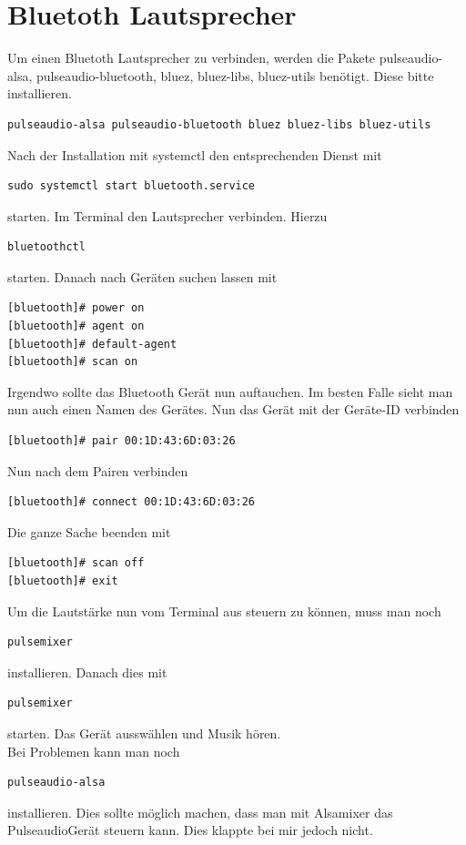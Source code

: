 \documentclass[11pt,fleqn]{book} %
\numberwithin{equation}{section} %
\numberwithin{figure}{section} %
\numberwithin{table}{section} %
\begin{document}
\chapter{Bluetoth Lautsprecher}
Um einen Bluetoth Lautsprecher zu verbinden, werden die Pakete pulseaudio-alsa, pulseaudio-bluetooth, bluez, bluez-libs, bluez-utils benötigt. Diese bitte installieren. 
\begin{lstlisting}
pulseaudio-alsa pulseaudio-bluetooth bluez bluez-libs bluez-utils
\end{lstlisting}
Nach der Installation mit systemctl den entsprechenden Dienst mit
\begin{lstlisting}
sudo systemctl start bluetooth.service
\end{lstlisting}
starten. Im Terminal den Lautsprecher verbinden. Hierzu
\begin{lstlisting}
bluetoothctl
\end{lstlisting}
starten. Danach nach Geräten suchen lassen mit
\begin{lstlisting}
[bluetooth]# power on
[bluetooth]# agent on
[bluetooth]# default-agent
[bluetooth]# scan on
\end{lstlisting}
Irgendwo sollte das Bluetooth Gerät nun auftauchen. Im besten Falle sieht man nun auch einen Namen des Gerätes. Nun das Gerät mit der Geräte-ID verbinden
\begin{lstlisting}
[bluetooth]# pair 00:1D:43:6D:03:26
\end{lstlisting}
Nun nach dem Pairen verbinden
\begin{lstlisting}
[bluetooth]# connect 00:1D:43:6D:03:26
\end{lstlisting}
Die ganze Sache beenden mit
\begin{lstlisting}
[bluetooth]# scan off
[bluetooth]# exit
\end{lstlisting}
Um die Lautstärke nun vom Terminal aus steuern zu können, muss man noch
\begin{lstlisting}
pulsemixer
\end{lstlisting}
installieren. Danach dies mit 
\begin{lstlisting}
pulsemixer
\end{lstlisting}
starten. Das Gerät ausswählen und Musik hören.\\
Bei Problemen kann man noch
\begin{lstlisting}
pulseaudio-alsa
\end{lstlisting}
installieren. Dies sollte möglich machen, dass man mit Alsamixer das PulseaudioGerät steuern kann. Dies klappte bei mir jedoch nicht.
\end{document}
